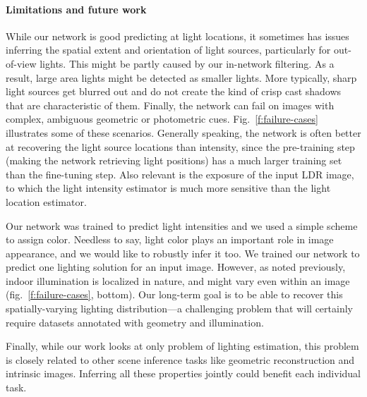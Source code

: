 \paragraph{Limitations and future work} 

While our network is good predicting at light locations, it sometimes has issues inferring the spatial extent and orientation of light sources, particularly for out-of-view lights. This might be partly caused by our in-network filtering. As a result, large area lights might be detected as smaller lights. More typically, sharp light sources get blurred out and do not create the kind of crisp cast shadows that are characteristic of them. Finally, the network can fail on images with complex, ambiguous geometric or photometric cues. Fig.~\ref{f:failure-cases} illustrates some of these scenarios. Generally speaking, the network is often better at recovering the light source locations than intensity, since the pre-training step (making the network retrieving light positions) has a much larger training set than the fine-tuning step. Also relevant is the exposure of the input LDR image, to which the light intensity estimator is much more sensitive than the light location estimator.

Our network was trained to predict light intensities and we used a simple scheme to assign color. Needless to say, light color plays an important role in image appearance, and we would like to robustly infer it too. We trained our network to predict one lighting solution for an input image. However, as noted previously, indoor illumination is localized in nature, and might vary even within an image (fig.~\ref{f:failure-cases}, bottom). Our long-term goal is to be able to recover this spatially-varying lighting distribution---a challenging problem that will certainly require datasets annotated with geometry and illumination.

Finally, while our work looks at only problem of lighting estimation, this problem is closely related to other scene inference tasks like geometric reconstruction and intrinsic images. Inferring all these properties jointly could benefit each individual task.


